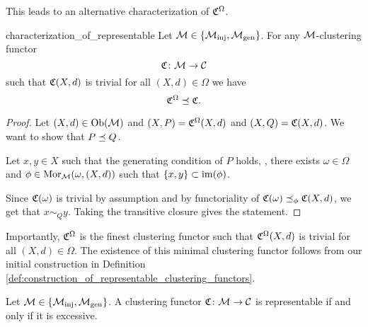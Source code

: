 This leads to an alternative characterization of $\mathfrak{C}^\Omega$.

\begin{proposition}{}{characterization_of_representable}
Let $\mathcal{M} \in \{{\mathcal{M}_\mathrm{inj}}, {\mathcal{M}_\mathrm{gen}}\}$. For any $\mathcal{M}$-clustering functor
$$
\mathfrak{C}\colon \mathcal{M} \to \mathcal{C}
$$
such that $\mathfrak{C}(X,d)$ is trivial for all $(X,d) \in \Omega$ we have
$$
\mathfrak{C}^\Omega \preceq \mathfrak{C}.
$$
\end{proposition}

\begin{proof}
Let $(X,d) \in \mathrm {Ob}(\mathcal{M})$ and $(X,P) = \mathfrak{C}^\Omega(X,d)$ and $(X,Q) = \mathfrak{C}(X,d)$. We want to show that $P \preceq Q$.

Let $x,y \in X$ such that the generating condition of $P$ holds, \ie, there exists $\omega \in \Omega$ and $\phi \in \mathrm {Mor}_{\mathcal{M}}(\omega, (X,d))$ such that $\{x,y\} \subset \operatorname*{im}(\phi)$.

Since $\mathfrak{C}(\omega)$ is trivial by assumption and by functoriality of $\mathfrak{C}(\omega) \preceq_\phi \mathfrak{C}(X,d)$, we get that $x \sim_Q y$. Taking the transitive closure gives the statement.
\end{proof}

Importantly, $\mathfrak{C}^\Omega$ is the finest clustering functor such that $\mathfrak{C}^\Omega(X,d)$ is trivial for all $(X,d) \in \Omega$. The existence of this minimal clustering functor follows from our initial construction in Definition \ref{def:construction_of_representable_clustering_functors}.

\begin{theorem}{\cite[Thm.~6.2]{Carlsson2010}}{}
Let $\mathcal{M} \in \{{\mathcal{M}_\mathrm{inj}}, {\mathcal{M}_\mathrm{gen}}\}$. A clustering functor $\mathfrak{C}\colon \mathcal{M} \to \mathcal{C}$ is representable if and only if it is excessive.
\end{theorem}


